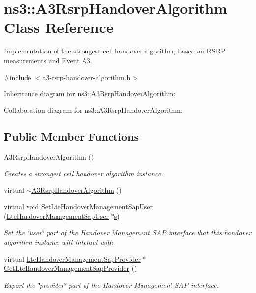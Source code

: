 \hypertarget{classns3_1_1A3RsrpHandoverAlgorithm}{}\section{ns3\+:\+:A3\+Rsrp\+Handover\+Algorithm Class Reference}
\label{classns3_1_1A3RsrpHandoverAlgorithm}


Implementation of the strongest cell handover algorithm, based on R\+S\+RP measurements and Event A3.  




{\ttfamily \#include $<$a3-\/rsrp-\/handover-\/algorithm.\+h$>$}



Inheritance diagram for ns3\+:\+:A3\+Rsrp\+Handover\+Algorithm\+:


Collaboration diagram for ns3\+:\+:A3\+Rsrp\+Handover\+Algorithm\+:
\subsection*{Public Member Functions}
\begin{DoxyCompactItemize}
\item 
\hyperlink{classns3_1_1A3RsrpHandoverAlgorithm_a6e4ba38b97c939d2f85e570d77f2905d}{A3\+Rsrp\+Handover\+Algorithm} ()
\begin{DoxyCompactList}\small\item\em Creates a strongest cell handover algorithm instance. \end{DoxyCompactList}\item 
virtual \hyperlink{classns3_1_1A3RsrpHandoverAlgorithm_ac1e7313f17a882525ef47c17edc796c3}{$\sim$\+A3\+Rsrp\+Handover\+Algorithm} ()
\item 
virtual void \hyperlink{classns3_1_1A3RsrpHandoverAlgorithm_ae3bbe08d5f94370dc025984ced30484d}{Set\+Lte\+Handover\+Management\+Sap\+User} (\hyperlink{classns3_1_1LteHandoverManagementSapUser}{Lte\+Handover\+Management\+Sap\+User} $\ast$\hyperlink{generate__test__data__lte__sinr_8m_ad83eeb3a142285d1243a08c6b7026df8}{s})
\begin{DoxyCompactList}\small\item\em Set the \char`\"{}user\char`\"{} part of the Handover Management S\+AP interface that this handover algorithm instance will interact with. \end{DoxyCompactList}\item 
virtual \hyperlink{classns3_1_1LteHandoverManagementSapProvider}{Lte\+Handover\+Management\+Sap\+Provider} $\ast$ \hyperlink{classns3_1_1A3RsrpHandoverAlgorithm_a9fa1e860d2b8a6e4af53a54de4072471}{Get\+Lte\+Handover\+Management\+Sap\+Provider} ()
\begin{DoxyCompactList}\small\item\em Export the \char`\"{}provider\char`\"{} part of the Handover Management S\+AP interface. \end{DoxyCompactList}\end{DoxyCompactItemize}
